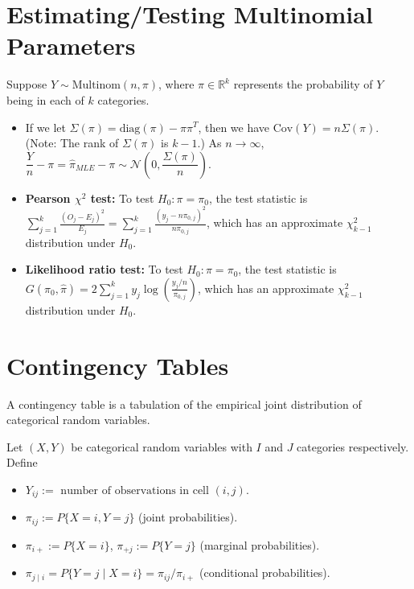 \documentclass[twoside]{article}
\newcommand\dis{\displaystyle}
\newcommand\bbR{\mathbb{R}}
\newcommand\calN{\mathcal{N}}
\newcommand\Sg{\Sigma}
\newcommand\goesto{\rightarrow}
\begin{document}
\section{Estimating/Testing Multinomial Parameters}
Suppose $Y \sim \text{Multinom}(n, \pi)$, where $\pi \in \bbR^k$ represents the probability of $Y$ being in each of $k$ categories.

\begin{itemize}
\item If we let $\Sg(\pi) = \text{diag}(\pi) - \pi \pi^T$, then we have $\text{Cov}(Y) = n \Sg(\pi)$. (Note: The rank of $\Sg(\pi)$ is $k-1$.) As $n \goesto \infty$, $\dfrac{Y}{n} - \pi = \hat{\pi}_{MLE} - \pi \sim \calN\left(0, \dfrac{\Sg(\pi)}{n}\right)$.

\item \textbf{Pearson $\chi^2$ test:} To test $H_0: \pi = \pi_0$, the test statistic is $\dis\sum_{j=1}^k \frac{(O_j - E_j)^2}{E_j} = \sum_{j=1}^k \frac{(y_j - n\pi_{0, j})^2}{n\pi_{0, j}}$, which has an approximate $\chi_{k-1}^2$ distribution under $H_0$.

\item \textbf{Likelihood ratio test:} To test $H_0: \pi = \pi_0$, the test statistic is $G(\pi_0, \hat{\pi}) = 2 \dis\sum_{j=1}^k y_j \log \left( \frac{y_j/n}{\pi_{0, j}}  \right)$, which has an approximate $\chi_{k-1}^2$ distribution under $H_0$.

\end{itemize}

\section{Contingency Tables}
A contingency table is a tabulation of the empirical joint distribution of categorical random variables.

Let $(X, Y)$ be categorical random variables with $I$ and $J$ categories respectively. Define
\begin{itemize}
\item $Y_{ij} := \text{ number of observations in cell } (i, j)$.
\item $\pi_{ij} := P \{ X = i, Y = j \}$ (joint probabilities).
\item $\pi_{i+} := P \{ X = i \}$, $\pi_{+j} := P \{ Y = j \}$ (marginal probabilities).
\item $\pi_{j \mid i} = P \{ Y = j \mid X = i \} = \pi_{ij} / \pi_{i+}$ (conditional probabilities).
\end{itemize}
\end{document}
